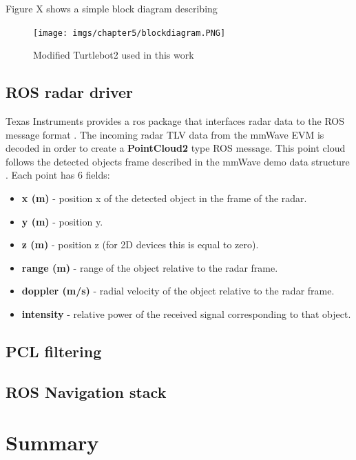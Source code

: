 Figure X shows a simple block diagram describing   
\begin{figure}[h] 
\centerline{\texttt{[image: imgs/chapter5/blockdiagram.PNG]}}
\caption{Modified Turtlebot2 used in this work}
\label{fig::turlebot2}
\end{figure}
\subsection{ROS radar driver}
Texas Instruments provides a ros package that interfaces radar data to the ROS message format \cite{tidriver}. The incoming radar TLV data from the mmWave EVM is decoded in order to create a  \textbf{PointCloud2} type ROS message.
This point cloud follows the detected objects frame described in the mmWave demo data structure \cite{}. 
Each point has 6 fields:
\begin{itemize}
\item \textbf{x (m)} - position x of the detected  object in the frame of the radar.
\item \textbf{y (m)} - position y.
\item \textbf{z (m)} - position z (for 2D devices this is equal to zero).
\item \textbf{range (m)} - range of the object relative to the radar frame.
\item \textbf{doppler (m/s)} - radial velocity of the object relative to the radar frame.
\item \textbf{intensity} - relative power of the received signal corresponding to that object.
\end{itemize}
\subsection{\ac{PCL} filtering}

\subsection{ROS Navigation stack}


\section{Summary}   

